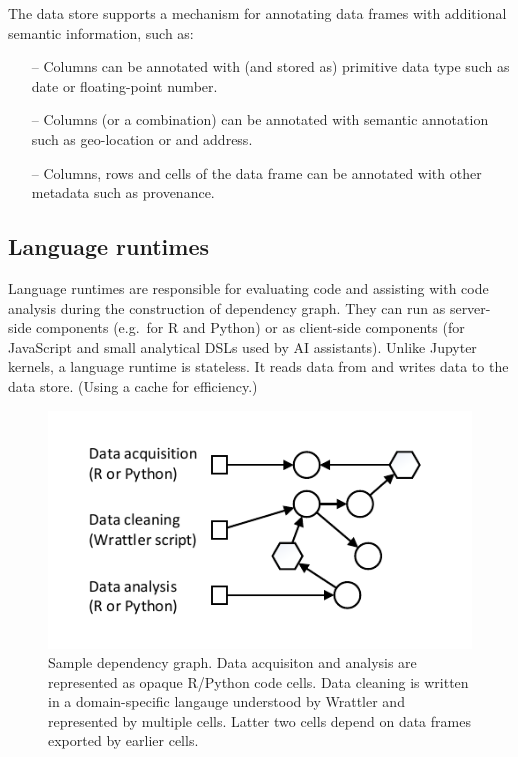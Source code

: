 \documentclass[sigplan,preprint,10pt]{acmart}\settopmatter{printfolios=true,printccs=false,printacmref=false}
\theoremstyle{plain}
\theoremstyle{definition}
\begin{document}
The data store supports a mechanism for annotating data frames with additional semantic information, such as:
%
\begin{itemize}
\item[--] Columns can be annotated with (and stored as) primitive data type such as date or floating-point number.
\vspace{0.25em}
\item[--] Columns (or a combination) can be annotated with semantic annotation such as geo-location or and address.
\vspace{-0.85em}
\item[--] Columns, rows and cells of the data frame can be annotated with other metadata such as provenance.
\end{itemize}

\subsection{Language runtimes}

Language runtimes are responsible for evaluating code and assisting with code analysis during
the construction of dependency graph. They can run as server-side components (e.g.~for R and Python) 
or as client-side components (for JavaScript and small analytical DSLs used by AI assistants). 
Unlike Jupyter kernels, a language runtime is stateless. It reads data from and writes data to
the data store. (Using a cache for efficiency.)


\begin{figure}
\includegraphics[scale=1,trim=0.5cm 0.5cm 0.5cm 0.5cm]{graph.pdf}
\vspace{-0.5em}
\caption{\small{Sample dependency graph. Data acquisiton and analysis are represented as 
opaque R/Python code cells. Data cleaning is written in a domain-specific langauge understood by
Wrattler and represented by multiple cells. Latter two cells depend on data frames exported by
earlier cells.}}
\label{fig:deps}
\vspace{-0.5em}
\end{figure}
\end{document}

